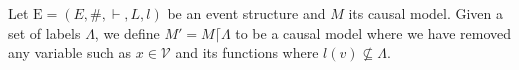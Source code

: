 \begin{definition}
    Let $\mathrm{E} = (E,\#,\vdash,L,l)$ be an event structure and $M$ its
    causal model.
    Given a set of labels $\Lambda$, we define $M' = M\lceil \Lambda$ to be
    a causal model where we have removed any variable such as
    $x \in \mathcal{V}$ and its functions where $l(v) \not \subseteq \Lambda$.
\end{definition}